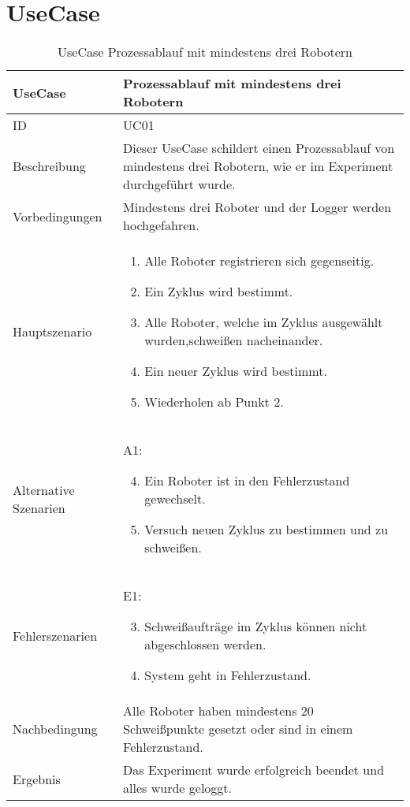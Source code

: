 \section{UseCase}
\begin{table}[h!]
\begin{center}
\begin{tabular}{ |p{2.8cm}|p{11cm}| } 
 \hline
 UseCase & Prozessablauf mit mindestens drei Robotern \\
 \hline
 ID & UC01 \\
 \hline
 Beschreibung & Dieser UseCase schildert einen Prozessablauf von mindestens drei Robotern, wie
 er im Experiment durchgeführt wurde. \\
 \hline
 Vorbedingungen & Mindestens drei Roboter und der Logger werden hochgefahren.\\
 \hline
 Hauptszenario & 
 \begin{enumerate}
  \item Alle Roboter registrieren sich gegenseitig.
  \item Ein Zyklus wird bestimmt.
  \item Alle Roboter, welche im Zyklus ausgewählt wurden,\newline schweißen nacheinander.
  \item Ein neuer Zyklus wird bestimmt.
  \item Wiederholen ab Punkt 2.
 \end{enumerate} \\
 \hline
 Alternative Szenarien &
 A1: \newline
 \begin{enumerate}
  \setcounter{enumi}{3}
  \item Ein Roboter ist in den Fehlerzustand gewechselt.
  \item Versuch neuen Zyklus zu bestimmen und zu schweißen.
 \end{enumerate}  \\
 \hline
 Fehlerszenarien & 
 E1: \newline
 \begin{enumerate}
   \setcounter{enumi}{2}
   \item Schweißaufträge im Zyklus können nicht abgeschlossen werden.
   \item System geht in Fehlerzustand.
 \end{enumerate} \\
 \hline
 Nachbedingung & Alle Roboter haben mindestens 20 Schweißpunkte gesetzt oder sind in einem Fehlerzustand. \\
 \hline
 Ergebnis & Das Experiment wurde erfolgreich beendet und alles wurde geloggt. \\ 
 \hline
\end{tabular}
\caption{UseCase Prozessablauf mit mindestens drei Robotern}
\label{table:usecase1}
\end{center}
\end{table}
